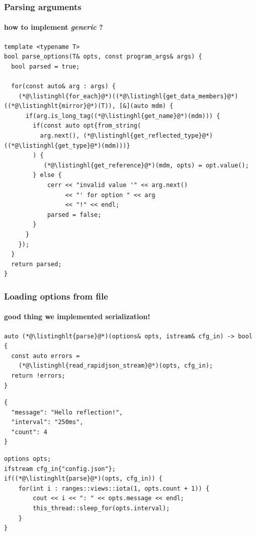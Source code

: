 \documentclass[compress,table,xcolor=table]{beamer}
\begin{document}
\begin{frame}[fragile]
  \frametitle{Parsing arguments}
  \framesubtitle{how to implement {\em \larger generic} ?}
  \begin{lstlisting}[language=c++2x,basicstyle=\scriptsize\ttfamily]
template <typename T>
bool parse_options(T& opts, const program_args& args) {
  bool parsed = true;

  for(const auto& arg : args) {
    (*@\listinghl{for_each}@*)((*@\listinghl{get_data_members}@*)((*@\listinghlt{mirror}@*)(T)), [&](auto mdm) {
      if(arg.is_long_tag((*@\listinghl{get_name}@*)(mdm))) {
        if(const auto opt{from_string(
          arg.next(), (*@\listinghl{get_reflected_type}@*)((*@\listinghl{get_type}@*)(mdm)))}
        ) {
           (*@\listinghl{get_reference}@*)(mdm, opts) = opt.value();
        } else {
            cerr << "invalid value '" << arg.next()
                 << "' for option " << arg
                 << "!" << endl;
            parsed = false;
        }
      }
    });
  }
  return parsed;
}
  \end{lstlisting}
\end{frame}
\begin{frame}[fragile]
  \frametitle{Loading options from file}
  \framesubtitle{good thing we implemented serialization!}
  \begin{lstlisting}[language=c++2x,basicstyle=\scriptsize\ttfamily]
auto (*@\listinghlt{parse}@*)(options& opts, istream& cfg_in) -> bool {
  const auto errors =
    (*@\listinghl{read_rapidjson_stream}@*)(opts, cfg_in);
  return !errors;
}
  \end{lstlisting}
  \begin{verbatim}
{
  "message": "Hello reflection!",
  "interval": "250ms",
  "count": 4
}
  \end{verbatim}
  \vfill
  \begin{lstlisting}[language=c++2x,basicstyle=\scriptsize\ttfamily]
options opts;
ifstream cfg_in{"config.json"};
if((*@\listinghlt{parse}@*)(opts, cfg_in)) {
    for(int i : ranges::views::iota(1, opts.count + 1)) {
        cout << i << ": " << opts.message << endl;
        this_thread::sleep_for(opts.interval);
    }
}
  \end{lstlisting}
\end{frame}
\end{document}
